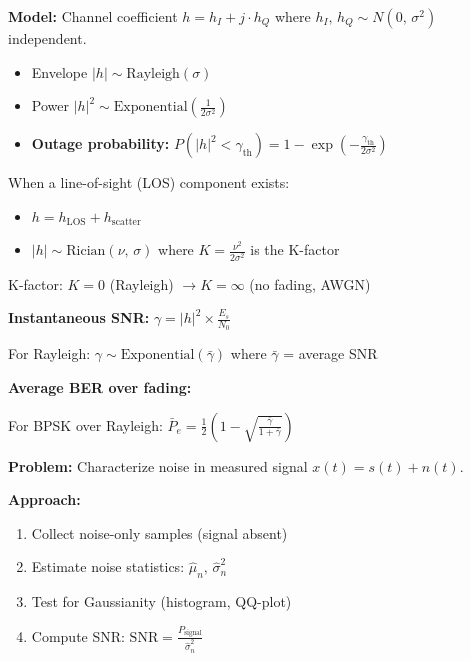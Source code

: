 
\textbf{Model:} Channel coefficient $h = h_{I} + j \cdot h_{Q}$ where $h_{I},\, h_{Q} \sim N(0,\, \sigma^{2})$ independent.

\begin{itemize}
\tightlist
\item
  Envelope $\lvert h\rvert \sim \mathrm{Rayleigh}(\sigma)$
\item
  Power $\lvert h\rvert^{2} \sim \mathrm{Exponential}\left(\frac{1}{2\sigma^{2}}\right)$
\item
  \textbf{Outage probability:} $P(\lvert h\rvert^{2} < \gamma_{\mathrm{th}}) = 1 - \exp \left(-\frac{\gamma_{\mathrm{th}}}{2\sigma^{2}}\right)$
\end{itemize}


When a line-of-sight (LOS) component exists:

\begin{itemize}
\tightlist
\item
  $h = h_{\mathrm{LOS}} + h_{\mathrm{scatter}}$
\item
  $\lvert h\rvert \sim \mathrm{Rician}(\nu,\, \sigma)$ where $K = \frac{\nu^{2}}{2\sigma^{2}}$ is the K-factor
\end{itemize}

K-factor: $K = 0$ (Rayleigh) $\to K = \infty$ (no fading, AWGN)


\textbf{Instantaneous SNR:} $\gamma = \lvert h\rvert^{2} \times \frac{E_{s}}{N_{0}}$

For Rayleigh: $\gamma \sim \mathrm{Exponential}(\bar{\gamma})$ where $\bar{\gamma}$ = average SNR

\textbf{Average BER over fading:}

For BPSK over Rayleigh: $\bar{P}_{e} = \frac{1}{2}\left(1 - \sqrt{\frac{\bar{\gamma}}{1+\bar{\gamma}}}\right)$



\textbf{Problem:} Characterize noise in measured signal $x(t) = s(t) + n(t)$.

\textbf{Approach:}

\begin{enumerate}
\def\labelenumi{\arabic{enumi}.}
\tightlist
\item
  Collect noise-only samples (signal absent)
\item
  Estimate noise statistics: $\hat{\mu}_{n},\, \hat{\sigma}^{2}_{n}$
\item
  Test for Gaussianity (histogram, QQ-plot)
\item
  Compute SNR: $\mathrm{SNR} = \frac{P_{\mathrm{signal}}}{\hat{\sigma}^{2}_{n}}$
\end{enumerate}


